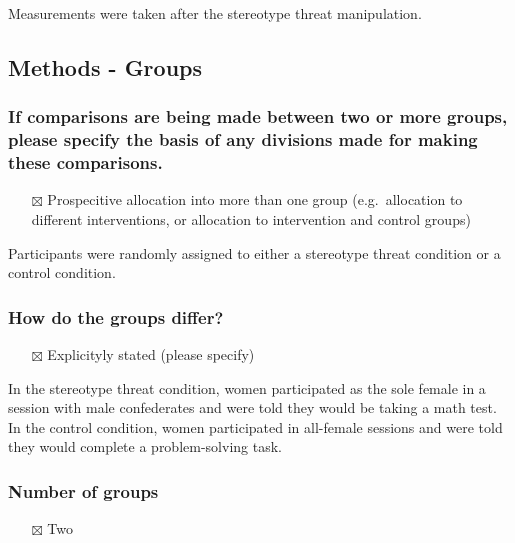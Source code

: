 \documentclass[
  doc, a4paper]{apa7}
\providecommand{\tightlist}{%
  \setlength{\itemsep}{0pt}\setlength{\parskip}{0pt}}
\begin{document}
Measurements were taken after the stereotype threat manipulation.

\subsection{Methods - Groups}\label{methods---groups}

\subsubsection{If comparisons are being made between two or more groups, please specify the basis of any divisions made for making these comparisons.}\label{if-comparisons-are-being-made-between-two-or-more-groups-please-specify-the-basis-of-any-divisions-made-for-making-these-comparisons.}

\begin{itemize}
\tightlist
\item[$\boxtimes$]
  Prospecitive allocation into more than one group (e.g.~allocation to different interventions, or allocation to intervention and control groups)
\end{itemize}

Participants were randomly assigned to either a stereotype threat condition or a control condition.

\subsubsection{How do the groups differ?}\label{how-do-the-groups-differ}

\begin{itemize}
\tightlist
\item[$\boxtimes$]
  Explicityly stated (please specify)
\end{itemize}

In the stereotype threat condition, women participated as the sole female in a session with male confederates and were told they would be taking a math test. In the control condition, women participated in all-female sessions and were told they would complete a problem-solving task.

\subsubsection{Number of groups}\label{number-of-groups}

\begin{itemize}
\tightlist
\item[$\boxtimes$]
  Two
\end{itemize}
\end{document}

